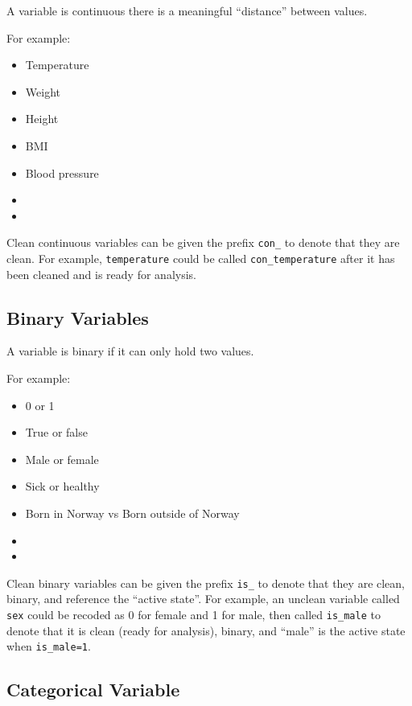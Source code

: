 \documentclass[12pt,]{article}
\providecommand{\tightlist}{%
  \setlength{\itemsep}{0pt}\setlength{\parskip}{0pt}}
\begin{document}
A variable is continuous there is a meaningful ``distance'' between
values.

For example:

\begin{itemize}
\tightlist
\item
  Temperature
\item
  Weight
\item
  Height
\item
  BMI
\item
  Blood pressure
\item
  \hfill \break
  \hfill \break
\item
  \hfill \break
  \hfill \break
\end{itemize}

Clean continuous variables can be given the prefix \texttt{con\_} to
denote that they are clean. For example, \texttt{temperature} could be
called \texttt{con\_temperature} after it has been cleaned and is ready
for analysis.

\subsection{Binary Variables}\label{binary-variables}

A variable is binary if it can only hold two values.

For example:

\begin{itemize}
\tightlist
\item
  0 or 1
\item
  True or false
\item
  Male or female
\item
  Sick or healthy
\item
  Born in Norway vs Born outside of Norway
\item
  \hfill \break
  \hfill \break
\item
  \hfill \break
  \hfill \break
\end{itemize}

Clean binary variables can be given the prefix \texttt{is\_} to denote
that they are clean, binary, and reference the ``active state''. For
example, an unclean variable called \texttt{sex} could be recoded as 0
for female and 1 for male, then called \texttt{is\_male} to denote that
it is clean (ready for analysis), binary, and ``male'' is the active
state when \texttt{is\_male=1}.

\subsection{Categorical Variable}\label{categorical-variable}
\end{document}
